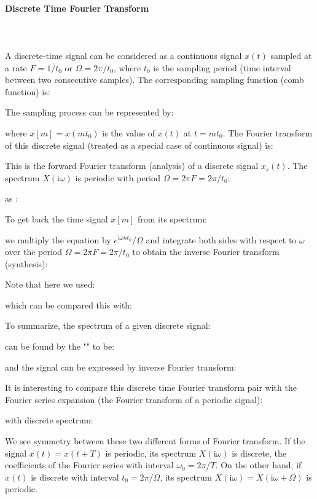 	\paragraph{Discrete Time Fourier Transform}\mbox{}\\\\
	A discrete-time signal can be considered as a continuous signal $x(t)$ 
	sampled at a rate $F=1/t_0$ or $\Omega=2\pi/t_0$, where $t_0$ is the 
	sampling period (time interval between two consecutive samples). The
	corresponding sampling function (comb function) is:
	
	The sampling process can be represented by:
	
	where $x[m]=x(mt_0)$ is the value of $x(t)$ at $t=mt_0$. The Fourier transform of this discrete signal (treated as a special case of continuous signal) is:
	
	This is the forward Fourier transform (analysis) of a discrete signal $x_s(t)$. The spectrum $X(\mathrm{i}\omega)$ is periodic with period $\Omega=2\pi F=2\pi/t_0$:
	
	as :
	
	
	To get back the time signal $x[m]$ from its spectrum:
	
	we multiply the equation by $e^{\mathrm{i}\omega nt_0}/\Omega$ and integrate both sides with respect to $\omega$ over the period $\Omega=2\pi F=2\pi/t_0$	to obtain the inverse Fourier transform (synthesis):
	
	Note that here we used:
	
	which can be compared this with:
	
	To summarize, the spectrum of a given discrete signal:
	
	can be found by the "" to be:
	
	and the signal can be expressed by inverse Fourier transform:
	
	It is interesting to compare this discrete time Fourier transform pair with the Fourier series expansion (the Fourier transform of a periodic signal): 
	
	
	with discrete spectrum:
	
	We see symmetry between these two different forms of Fourier transform. If the  signal $x(t)=x(t+T)$ is periodic, its spectrum $X(\mathrm{i}\omega)$ is discrete, the coefficients of the Fourier series with interval $\omega_0=2\pi/T$. On the other hand, if $x(t)$ is discrete with interval $t_0=2\pi/\Omega$, its spectrum $X(\mathrm{i}\omega)=X(\mathrm{i}\omega+\Omega)$ is periodic.
	

